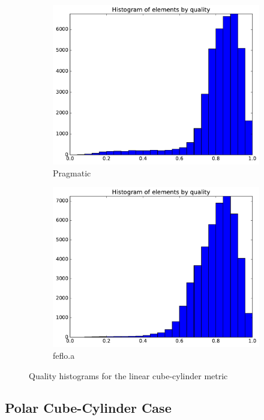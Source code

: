 \documentclass[3p,times,procedia,number]{elsarticle}
\begin{document}
\begin{figure}
\begin{subfigure}{.16\textwidth}
\includegraphics[width=\textwidth]{pragmatic-cube-cylinder-linear-quality.pdf}
\caption{Pragmatic}
\end{subfigure}
\begin{subfigure}{.16\textwidth}
\centering
\includegraphics[width=\textwidth]{fefloa-cube-cylinder-linear-quality.pdf}
\caption{feflo.a}
\end{subfigure}
\caption{Quality histograms for the linear cube-cylinder metric}
\label{fig:cube-cylinder-linear-qualities}
\end{figure}

\subsection{Polar Cube-Cylinder Case}
\label{sec:cube-cylinder-polar-1}
\end{document}
